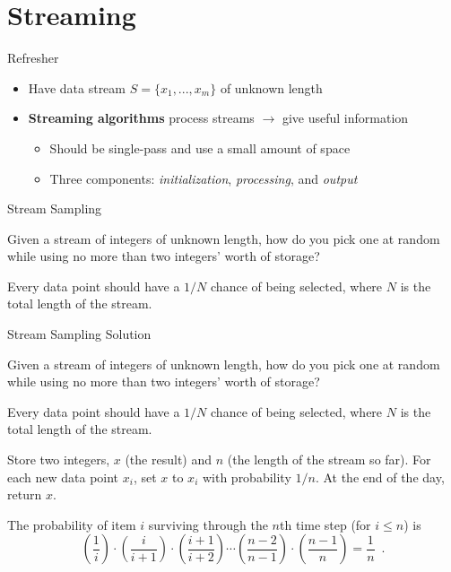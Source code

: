\documentclass[10pt]{beamer}
\begin{document}
\section{Streaming}

\begin{frame}{Refresher}

\begin{itemize}
\item Have data stream $S = \{x_1, ..., x_m\}$ of unknown length
\item \textbf{Streaming algorithms} process streams $\rightarrow$ give useful information
  \begin{itemize}
  \item Should be single-pass and use a small amount of space
  \item Three components: \textit{initialization}, \textit{processing}, and \textit{output}
  \end{itemize}
\end{itemize}

\end{frame}

\begin{frame}{Stream Sampling}

Given a stream of integers of unknown length, how do you pick one at random
while using no more than two integers' worth of storage?

Every data point should have a $1 / N$ chance of being selected,
where $N$ is the total length of the stream.

\end{frame}

\begin{frame}{Stream Sampling {\color{gray} Solution}}

Given a stream of integers of unknown length, how do you pick one at random
while using no more than two integers' worth of storage?

Every data point should have a $1 / N$ chance of being selected,
where $N$ is the total length of the stream.

{\color{blue}
Store two integers, $x$ (the result) and $n$ (the length of the stream so far).
For each new data point $x_i$, set $x$ to $x_i$ with probability $1 / n$. At the end of the day, return $x$.

The probability of item $i$ surviving through the $n$th time step (for $i \leq n$) is
$$\left(\frac{1}{i}\right)
\cdot \left(\frac{i}{i + 1}\right)
\cdot \left(\frac{i + 1}{i + 2}\right)
\cdots \left(\frac{n - 2}{n - 1}\right)
\cdot \left(\frac{n - 1}{n}\right) = \frac{1}{n} \enspace.$$
}

\end{frame}
\end{document}

